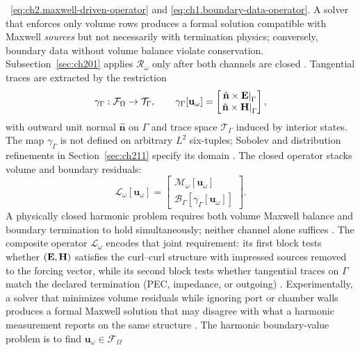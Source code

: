 ~\eqref{eq:ch2.maxwell-driven-operator} and
\eqref{eq:ch1.boundary-data-operator}. A solver that enforces only volume rows
produces a formal solution compatible with Maxwell \emph{sources} but not necessarily
with termination physics; conversely, boundary data without volume balance violate
conservation. Subsection~\ref{sec:ch201} applies \(\mathcal{R}_\omega\) only after
both channels are closed \cite{harrington2001}. Tangential traces are extracted by the restriction
\begin{equation}
\label{eq:ch2.trace-restriction}
\gamma_\Gamma:\mathcal{F}_\Omega\to\mathcal{T}_\Gamma,
\qquad
\gamma_\Gamma[\mathbf{u}_\omega]=
\begin{bmatrix}
\left.\hat{\mathbf{n}}\times\mathbf{E}\right|_{\Gamma}\\
\left.\hat{\mathbf{n}}\times\mathbf{H}\right|_{\Gamma}
\end{bmatrix},
\end{equation}
with outward unit normal \(\hat{\mathbf{n}}\) on \(\Gamma\) and trace space
\(\mathcal{T}_\Gamma\) induced by interior states. The map
\(\gamma_\Gamma\) is not defined on arbitrary \(L^{2}\) six-tuples; Sobolev and
distribution refinements in Section~\ref{sec:ch211} specify its domain
\cite{stratton1941}. The closed operator stacks volume and boundary residuals:
\begin{equation}
\label{eq:ch2.maxwell-boundary-composite}
\mathcal{L}_\omega[\mathbf{u}_\omega]=
\begin{bmatrix}
\mathcal{M}_\omega[\mathbf{u}_\omega]\\
\mathcal{B}_\Gamma[\gamma_\Gamma[\mathbf{u}_\omega]]
\end{bmatrix}.
\end{equation}
A physically closed harmonic problem requires both volume Maxwell balance and boundary
termination to hold simultaneously; neither channel alone suffices
\cite{stratton1941}. The composite operator \(\mathcal{L}_\omega\) encodes that joint
requirement: its first block tests whether \((\mathbf{E},\mathbf{H})\) satisfies the curl--curl structure
with impressed sources removed to the forcing vector, while its second block tests whether
tangential traces on \(\Gamma\) match the declared termination (PEC, impedance, or outgoing)
\cite{harrington2001}. Experimentally, a solver that minimizes volume residuals while
ignoring port or chamber walls produces a formal Maxwell solution that may disagree with
what a harmonic measurement reports on the same structure \cite{stratton1941}. The harmonic
boundary-value problem is to find \(\mathbf{u}_\omega\in\mathcal{F}_\Omega\)
